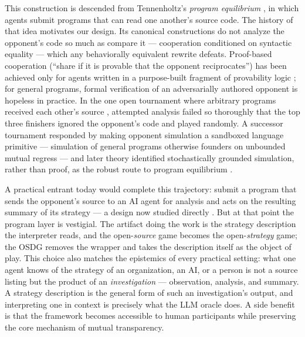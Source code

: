 \documentclass[11pt]{article}
\begin{document}
This construction is descended from Tennenholtz's \emph{program
equilibrium} \citep{tennenholtz2004program}, in which agents submit
programs that can read one another's source code.
The history of that idea motivates our design.
Its canonical constructions do not analyze the opponent's code so much
as compare it --- cooperation conditioned on syntactic equality ---
which any behaviorally equivalent rewrite defeats.
Proof-based cooperation (``share if it is provable that the opponent
reciprocates'') has been achieved only for agents written in a
purpose-built fragment of provability logic \citep{barasz2014robust};
for general programs, formal verification of an adversarially authored
opponent is hopeless in practice.
In the one open tournament where arbitrary programs received each
other's source \citep{ospd2013lesswrong}, attempted analysis failed so
thoroughly that the top three finishers ignored the opponent's code
and played randomly.
A successor tournament responded by making opponent simulation a
sandboxed language primitive \citep{pdtournament2014} --- simulation
of general programs otherwise founders on unbounded mutual regress ---
and later theory identified stochastically grounded simulation, rather
than proof, as the robust route to program equilibrium
\citep{oesterheld2019robust}.

A practical entrant today would complete this trajectory: submit a
program that sends the opponent's source to an AI agent for analysis
and acts on the resulting summary of its strategy --- a design now
studied directly \citep{sistla2025evaluating}.
But at that point the program layer is vestigial.
The artifact doing the work is the strategy description the
interpreter reads, and the open-\emph{source} game becomes the
open-\emph{strategy} game; the OSDG removes the wrapper and takes the
description itself as the object of play.
This choice also matches the epistemics of every practical setting:
what one agent knows of the strategy of an organization, an AI, or a
person is not a source listing but the product of an
\emph{investigation} --- observation, analysis, and summary.
A strategy description is the general form of such an investigation's
output, and interpreting one in context is precisely what the LLM
oracle does.
A side benefit is that the framework becomes accessible to human
participants while preserving the core mechanism of mutual
transparency.
\end{document}
